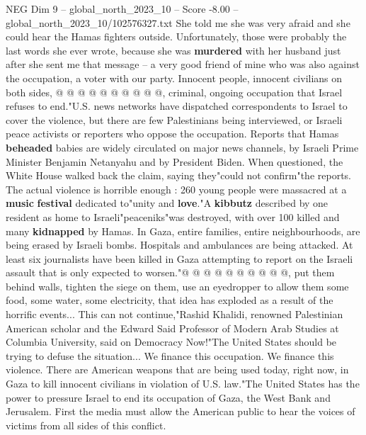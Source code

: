 \begin{textsample}{NEG Dim 9 – global\_north\_2023\_10 – Score -8.00 – global\_north\_2023\_10/102576327.txt}
She told me she was very afraid and she could hear the Hamas fighters outside.
Unfortunately, those were probably the last words she ever wrote, because she was \textbf{murdered} with her husband just after she sent me that message -- a very good friend of mine who was also against the occupation, a voter with our party.
Innocent people, innocent civilians on both sides, @ @ @ @ @ @ @ @ @ @, criminal, ongoing occupation that Israel refuses to end."U.S. news networks have dispatched correspondents to Israel to cover the violence, but there are few Palestinians being interviewed, or Israeli peace activists or reporters who oppose the occupation.
Reports that Hamas \textbf{beheaded} babies are widely circulated on major news channels, by Israeli Prime Minister Benjamin Netanyahu and by President Biden.
When questioned, the White House walked back the claim, saying they"could not confirm"the reports.
The actual violence is horrible enough : 260 young people were massacred at a \textbf{music} \textbf{festival} dedicated to"unity and \textbf{love}."A \textbf{kibbutz} described by one resident as home to Israeli"peaceniks"was destroyed, with over 100 killed and many \textbf{kidnapped} by Hamas.
In Gaza, entire families, entire neighbourhoods, are being erased by Israeli bombs.
Hospitals and ambulances are being attacked.
At least six journalists have been killed in Gaza attempting to report on the Israeli assault that is only expected to worsen."@ @ @ @ @ @ @ @ @ @, put them behind walls, tighten the siege on them, use an eyedropper to allow them some food, some water, some electricity, that idea has exploded as a result of the horrific events...
This can not continue,"Rashid Khalidi, renowned Palestinian American scholar and the Edward Said Professor of Modern Arab Studies at Columbia University, said on Democracy Now!"The United States should be trying to defuse the situation...
We finance this occupation.
We finance this violence.
There are American weapons that are being used today, right now, in Gaza to kill innocent civilians in violation of U.S. law."The United States has the power to pressure Israel to end its occupation of Gaza, the West Bank and Jerusalem.
First the media must allow the American public to hear the voices of victims from all sides of this conflict.

\end{textsample}
